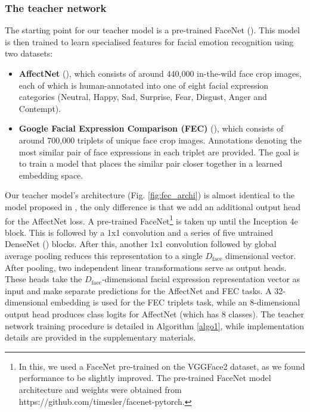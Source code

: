 \documentclass[times,twocolumn,final,authoryear]{elsarticle}
\begin{document}
	\subsubsection{The teacher network}
	\label{sec:teacher}
	
	The starting point for our teacher model is a pre-trained FaceNet (\cite{Schroff2015}). This model is then trained to learn specialised features for facial emotion recognition using two datasets:
	\begin{itemize}
		\item \textbf{AffectNet} (\cite{AffectNet}), which consists of around 440,000 in-the-wild face crop images, each of which is human-annotated into one of eight facial expression categories (Neutral, Happy, Sad, Surprise, Fear, Disgust, Anger and Contempt).
		\item \textbf{Google Facial Expression Comparison (FEC)} (\cite{GoogleFEC}), which consists of around 700,000 triplets of unique face crop images. Annotations denoting the most similar pair of face expressions in each triplet are provided. The goal is to train a model that places the similar pair closer together in a learned embedding space.
	\end{itemize}
	
	Our teacher model's architecture (Fig. \ref{fig:fec_archi}) is almost identical to the model proposed in \cite{GoogleFEC}, the only difference is that we add an additional output head for the AffectNet loss. A pre-trained FaceNet\footnote{In this, we used a FaceNet pre-trained on the VGGFace2 dataset, as we found performance to be slightly improved. The pre-trained FaceNet model architecture and weights were obtained from https://github.com/timesler/facenet-pytorch.} is taken up until the Inception 4e block. This is followed by a 1x1 convolution and a series of five untrained DenseNet (\cite{DenseNet}) blocks. After this, another 1x1 convolution followed by global average pooling reduces this representation to a single $D_{\text{face}}$ dimensional vector. After pooling, two independent linear transformations serve as output heads. These heads take the $D_{\text{face}}$-dimensional facial expression representation vector as input and make separate predictions for the AffectNet and FEC tasks. A 32-dimensional embedding is used for the FEC triplets task, while an 8-dimensional output head produces class logits for AffectNet (which has 8 classes). The teacher network training procedure is detailed in Algorithm \ref{algo1}, while implementation details are provided in the supplementary materials.
	
\end{document}
